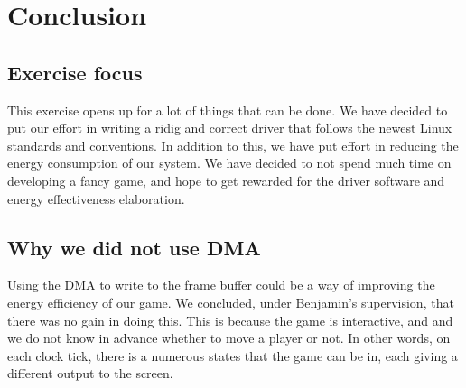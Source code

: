 \section{Conclusion}

\subsection{Exercise focus}
This exercise opens up for a lot of things that can be done. We have decided to put our effort in writing a ridig and correct driver that follows the newest Linux standards and conventions. In addition to this, we have put effort in reducing the energy consumption of our system. We have decided to not spend much time on developing a fancy game, and hope to get rewarded for the driver software and energy effectiveness elaboration. 


\subsection{Why we did not use DMA}
Using the DMA to write to the frame buffer could be a way of improving the energy efficiency of our game. We concluded, under Benjamin's supervision, that there was no gain in doing this. This is because the game is interactive, and and we do not know in advance whether to move a player or not. In other words, on each clock tick, there is a numerous states that the game can be in, each giving a different output to the screen.
